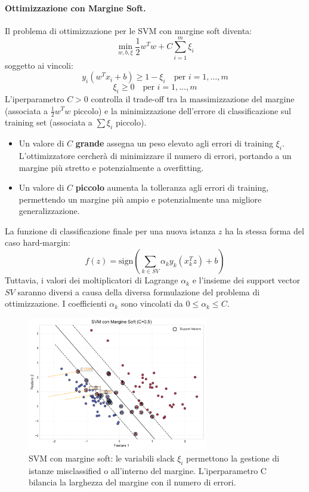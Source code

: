 \documentclass{article}
\begin{document}
\paragraph{Ottimizzazione con Margine Soft.}
Il problema di ottimizzazione per le SVM con margine soft diventa:
$$ \min_{w,b,\xi} \frac{1}{2} w^T w + C \sum_{i=1}^{m} \xi_i $$
soggetto ai vincoli:
$$ y_i (w^T x_i + b) \ge 1 - \xi_i \quad \text{per } i=1, \dots, m $$
$$ \xi_i \ge 0 \quad \text{per } i=1, \dots, m $$
L'iperparametro $C > 0$ controlla il trade-off tra la massimizzazione del margine (associata a $\frac{1}{2} w^T w$ piccolo) e la minimizzazione dell'errore di classificazione sul training set (associata a $\sum \xi_i$ piccolo).
\begin{itemize}
    \item Un valore di $C$ \textbf{grande} assegna un peso elevato agli errori di training $\xi_i$. L'ottimizzatore cercherà di minimizzare il numero di errori, portando a un margine più stretto e potenzialmente a overfitting.
    \item Un valore di $C$ \textbf{piccolo} aumenta la tolleranza agli errori di training, permettendo un margine più ampio e potenzialmente una migliore generalizzazione.
\end{itemize}
La funzione di classificazione finale per una nuova istanza $z$ ha la stessa forma del caso hard-margin:
$$ f(z) = \text{sign} \left( \sum_{k \in SV} \alpha_k y_k (x_k^T z) + b \right) $$
Tuttavia, i valori dei moltiplicatori di Lagrange $\alpha_k$ e l'insieme dei support vector $SV$ saranno diversi a causa della diversa formulazione del problema di ottimizzazione. I coefficienti $\alpha_k$ sono vincolati da $0 \le \alpha_k \le C$.

\begin{figure}[H]
    \centering
    \includegraphics[width=0.7\textwidth]{images/soft_margin_svm.pdf}
    \caption{SVM con margine soft: le variabili slack $\xi_i$ permettono la gestione di istanze misclassified o all'interno del margine. L'iperparametro C bilancia la larghezza del margine con il numero di errori.}
    \label{fig:soft_margin_svm}
\end{figure}
\end{document}
